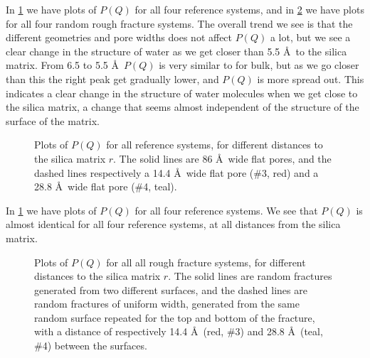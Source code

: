 In \cref{fig:top_all_reference} we have plots of $P(Q)$ for all four reference systems, and in \cref{fig:top_all_rough} we have plots for all four random rough fracture systems. The overall trend we see is that the different geometries and pore widths does not affect $P(Q)$ a lot, but we see a clear change in the structure of water as we get closer than 5.5 \AA\ to the silica matrix. From 6.5 to 5.5 \AA\ $P(Q)$ is very similar to for bulk, but as we go closer than this the right peak get gradually lower, and $P(Q)$ is more spread out. This indicates a clear change in the structure of water molecules when we get close to the silica matrix, a change that seems almost independent of the structure of the surface of the matrix.

%
\begin{figure}[!p]%
    \centering%
    \captionsetup{width=\textwidth}%
    \caption{%
        Plots of $P(Q)$ for all reference systems, for different distances to the silica matrix $r$. The solid lines are 86 \AA\ wide flat pores, and the dashed lines respectively a 14.4 \AA\ wide flat pore (\#3, red) and a 28.8 \AA\ wide flat pore (\#4, teal).%
        \label{fig:top_all_reference}%
    }%
\end{figure}%

In \cref{fig:top_all_reference} we have plots of $P(Q)$ for all four reference systems. We see that $P(Q)$ is almost identical for all four reference systems, at all distances from the silica matrix.

%
\begin{figure}[!p]%
    \centering%
    \captionsetup{width=\textwidth}%
    \caption{%
        Plots of $P(Q)$ for all all rough fracture systems, for different distances to the silica matrix $r$. The solid lines are random fractures generated from two different surfaces, and the dashed lines are random fractures of uniform width, generated from the same random surface repeated for the top and bottom of the fracture, with a distance of respectively 14.4 \AA\ (red, \#3) and 28.8 \AA\ (teal, \#4) between the surfaces.%
        \label{fig:top_all_rough}%
    }%
\end{figure}%

